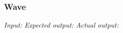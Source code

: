 \subsubsection{Wave}

\emph{Input: } 
\emph{Expected output: }
\emph{Actual output: }



	



	
		
%
	
	

